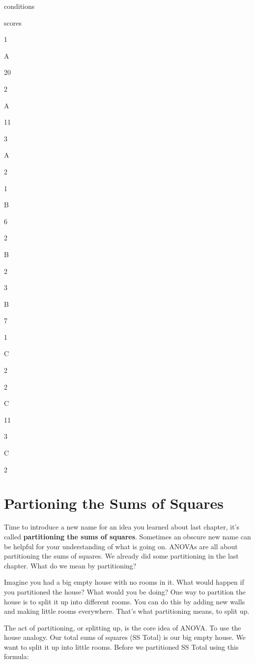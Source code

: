 \documentclass[]{book}
\begin{document}
conditions

scores

1

A

20

2

A

11

3

A

2

1

B

6

2

B

2

3

B

7

1

C

2

2

C

11

3

C

2

\hypertarget{partioning-the-sums-of-squares}{%
\section{Partioning the Sums of Squares}\label{partioning-the-sums-of-squares}}

Time to introduce a new name for an idea you learned about last chapter, it's called \textbf{partitioning the sums of squares}. Sometimes an obscure new name can be helpful for your understanding of what is going on. ANOVAs are all about partitioning the sums of squares. We already did some partitioning in the last chapter. What do we mean by partitioning?

Imagine you had a big empty house with no rooms in it. What would happen if you partitioned the house? What would you be doing? One way to partition the house is to split it up into different rooms. You can do this by adding new walls and making little rooms everywhere. That's what partitioning means, to split up.

The act of partitioning, or splitting up, is the core idea of ANOVA. To use the house analogy. Our total sums of squares (SS Total) is our big empty house. We want to split it up into little rooms. Before we partitioned SS Total using this formula:
\end{document}
